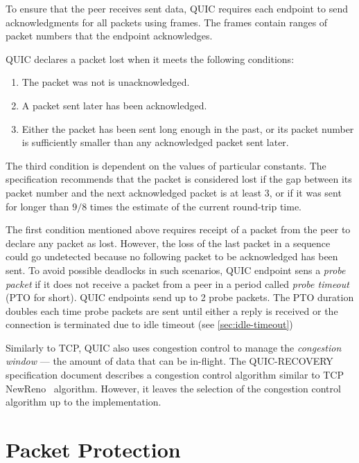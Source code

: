 To ensure that the peer receives sent data, QUIC requires each endpoint to send acknowledgments for
all packets using \ACK{} frames. The \ACK{} frames contain ranges of packet numbers that the
endpoint acknowledges.

QUIC declares a packet lost when it meets the following conditions:

\begin{enumerate}

  \item The packet was not is unacknowledged.

  \item A packet sent later has been acknowledged.

  \item Either the packet has been sent long enough in the past, or its packet number is
sufficiently smaller than any acknowledged packet sent later.

\end{enumerate}

The third condition is dependent on the values of particular constants. The specification recommends
that the packet is considered lost if the gap between its packet number and the next acknowledged
packet is at least 3, or if it was sent for longer than $9/8$ times the estimate of the current
round-trip time.

The first condition mentioned above requires receipt of a packet from the peer to declare any packet
as lost. However, the loss of the last packet in a sequence could go undetected because no following
packet to be acknowledged has been sent. To avoid possible deadlocks in such scenarios, QUIC
endpoint sens a \textit{probe packet} if it does not receive a packet from a peer in a period called
\textit{probe timeout} (PTO for short). QUIC endpoints send up to 2 probe packets. The PTO duration
doubles each time probe packets are sent until either a reply is received or the connection is
terminated due to idle timeout (see \autoref{sec:idle-timeout})

Similarly to TCP, QUIC also uses congestion control to manage the \textit{congestion window} --- the
amount of data that can be in-flight. The QUIC-RECOVERY specification document describes a
congestion control algorithm similar to TCP NewReno~\cite{rfc6582} algorithm. However, it leaves the
selection of the congestion control algorithm up to the implementation.

\section{Packet Protection}\label{sec:packet-protection}

